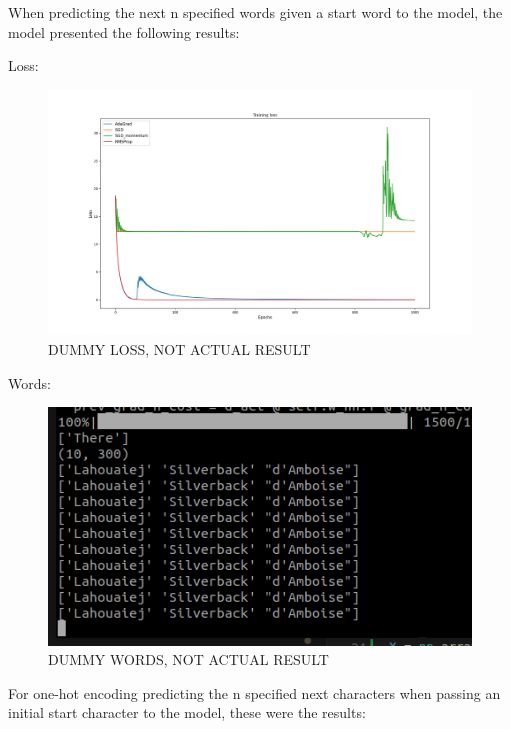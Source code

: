 \documentclass[12pt]{article}
\begin{document}
When predicting the next n specified words given a start word to the model, the model presented the following results: 

Loss:
\begin{figure}
    \centering
    \includegraphics[width = \textwidth]{texfiles/images/dummy_loss.png}
    \caption{DUMMY LOSS, NOT ACTUAL RESULT}
    \label{fig:enter-label}
\end{figure}

Words:
\begin{figure}
    \centering
    \includegraphics[width = \textwidth]{texfiles/images/dummy_words.png}
    \caption{DUMMY WORDS, NOT ACTUAL RESULT}
    \label{fig:enter-label}
\end{figure}

For one-hot encoding predicting the n specified next characters when passing an initial start character to the model, these were the results: 
\end{document}
